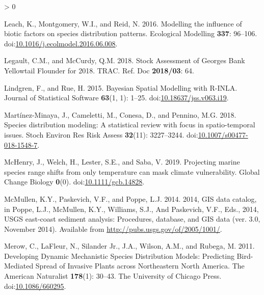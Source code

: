 \documentclass[
]{article}
\newlength{\cslhangindent}
\newenvironment{CSLReferences}[2] %
 {%
  \setlength{\parindent}{0pt}
  \ifodd #1 \everypar{\setlength{\hangindent}{\cslhangindent}}\ignorespaces\fi
  \ifnum #2 > 0
  \setlength{\parskip}{#2\baselineskip}
  \fi
 }%
 {}
\begin{document}
\begin{CSLReferences}{1}{0}
\leavevmode\hypertarget{ref-leachModellingInfluenceBiotic2016}{}%
Leach, K., Montgomery, W.I., and Reid, N. 2016. Modelling the influence of biotic factors on species distribution patterns. Ecological Modelling \textbf{337}: 96--106. doi:\href{https://doi.org/10.1016/j.ecolmodel.2016.06.008}{10.1016/j.ecolmodel.2016.06.008}.

\leavevmode\hypertarget{ref-legaultStockAssessmentGeorges2018}{}%
Legault, C.M., and McCurdy, Q.M. 2018. Stock {Assessment} of {Georges Bank Yellowtail Flounder} for 2018. TRAC. Ref. Doc \textbf{2018/03}: 64.

\leavevmode\hypertarget{ref-lindgrenBayesianSpatialModelling2015}{}%
Lindgren, F., and Rue, H. 2015. Bayesian {Spatial Modelling} with {R}-{INLA}. Journal of Statistical Software \textbf{63}(1, 1): 1--25. doi:\href{https://doi.org/10.18637/jss.v063.i19}{10.18637/jss.v063.i19}.

\leavevmode\hypertarget{ref-martinez-minayaSpeciesDistributionModeling2018}{}%
Martínez-Minaya, J., Cameletti, M., Conesa, D., and Pennino, M.G. 2018. Species distribution modeling: A statistical review with focus in spatio-temporal issues. Stoch Environ Res Risk Assess \textbf{32}(11): 3227--3244. doi:\href{https://doi.org/10.1007/s00477-018-1548-7}{10.1007/s00477-018-1548-7}.

\leavevmode\hypertarget{ref-mchenryProjectingMarineSpecies2019}{}%
McHenry, J., Welch, H., Lester, S.E., and Saba, V. 2019. Projecting marine species range shifts from only temperature can mask climate vulnerability. Global Change Biology \textbf{0}(0). doi:\href{https://doi.org/10.1111/gcb.14828}{10.1111/gcb.14828}.

\leavevmode\hypertarget{ref-mcmullen2014GISData2014}{}%
McMullen, K.Y., Paskevich, V.F., and Poppe, L.J. 2014. 2014, {GIS} data catalog, in {Poppe}, {L}.{J}., {McMullen}, {K}.{Y}., {Williams}, {S}.{J}., And {Paskevich}, {V}.{F}., Eds., 2014, {USGS} east-coast sediment analysis: {Procedures}, database, and {GIS} data (ver. 3.0, {November} 2014). Available from \url{http://pubs.usgs.gov/of/2005/1001/}.

\leavevmode\hypertarget{ref-merowDevelopingDynamicMechanistic2011}{}%
Merow, C., LaFleur, N., Silander Jr., J.A., Wilson, A.M., and Rubega, M. 2011. Developing {Dynamic Mechanistic Species Distribution Models}: {Predicting Bird}-{Mediated Spread} of {Invasive Plants} across {Northeastern North America}. The American Naturalist \textbf{178}(1): 30--43. {The University of Chicago Press}. doi:\href{https://doi.org/10.1086/660295}{10.1086/660295}.


\end{CSLReferences}
\end{document}
